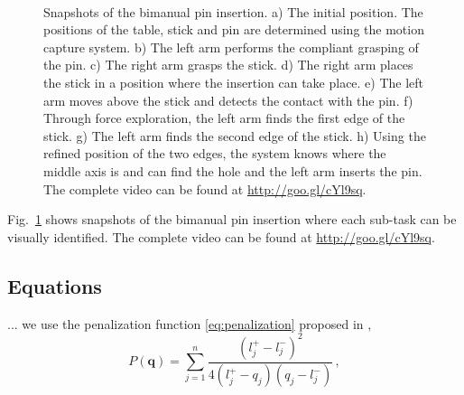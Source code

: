\documentclass[letterpaper, 10 pt, conference]{ieeeconf}
\newcommand{\fref}[1]{Fig.~\ref{#1}}
\newcommand\vect[1]{\boldsymbol{#1}}
\begin{document}
\begin{figure}[t]
  \centering
  \,
  \,
  \caption{Snapshots of the bimanual pin insertion. a) The initial position. The positions of the table, stick and pin are determined using the motion capture system. b) The left arm performs the compliant grasping of the pin. c) The right arm grasps the stick. d) The right arm places the stick in a position where the insertion can take place. e) The left arm moves above the stick and detects the contact with the pin. f) Through force exploration, the left arm finds the first edge of the stick. g) The left arm finds the second edge of the stick. h) Using the refined position of the two edges, the system knows where the middle axis is and can find the hole and the left arm inserts the pin. The complete video can be found at \protect\url{http://goo.gl/cYl9sq}.}
  \label{fig:snapshots}
\end{figure}
\fref{fig:snapshots} shows snapshots of the bimanual pin insertion where each sub-task can be visually identified. The complete video can be found at \url{http://goo.gl/cYl9sq}.

\subsection{Equations}

... we use the penalization function \eqref{eq:penalization} proposed in \cite{Dubey1995},
\begin{equation}
  P(\vect{q}) = \sum_{j=1}^{n}\dfrac{\left( l_{j}^{+} - l_{j}^{-} \right)^{2}}{4 \left( l_{j}^{+} - q_{j} \right)\left( q_{j} - l_{j}^{-} \right)} \, ,
  \label{eq:penalization} 
\end{equation}
\end{document}
